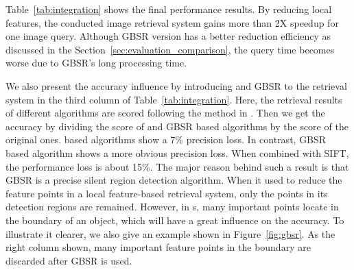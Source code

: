 Table~\ref{tab:integration} shows the final performance results. By reducing local features, the {\sys} conducted image retrieval system gains more than 2X speedup for one image query. Although GBSR version has a better reduction efficiency as discussed in the Section~\ref{sec:evaluation_comparison}, the query time becomes worse due to GBSR's long processing time.

We also present the accuracy influence by introducing {\sys} and GBSR to the retrieval system in the third column of Table~\ref{tab:integration}. Here, the retrieval results of different algorithms are scored following the method in \cite{nister-stewenius-cvpr-2006}. Then we get the accuracy by dividing the score of {\sys} and GBSR based algorithms by the score of the original ones. {\sys} based algorithms show a 7\% precision loss. In contrast, GBSR based algorithm shows a more obvious precision loss. When combined with SIFT, the performance loss is about 15\%. The major reason behind such a result is that GBSR is a precise silent region detection algorithm. When it used to reduce the feature points in a local feature-based retrieval system, only the points in its detection regions are remained. However, in {\lfea}s, many important points locate in the boundary of an object, which will have a great influence on the accuracy. To illustrate it clearer, we also give an example shown in Figure~\ref{fig:gbsr}. As the right column shown, many important feature points in the boundary are discarded after GBSR is used. 


